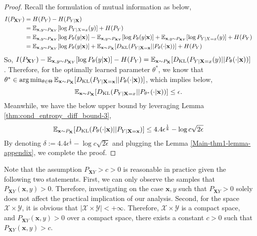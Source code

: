 \begin{proof} 
Recall the formulation of mutual information as below,
\begin{align*}
    I(P_{\mathbf{X}Y})
    &=H(P_Y) - H(P_{Y|\mathbf{X}}) \\
    &=\mathbb{E}_{\mathbf{x},y\sim P_{\mathbf{X}Y}}[\log P_{Y|X=x}(y)] + H(P_Y) \\
    &=\mathbb{E}_{\mathbf{x},y\sim P_{\mathbf{X}Y}}[\log P_{\theta}(y|\mathbf{x})] - \mathbb{E}_{\mathbf{x},y\sim P_{\mathbf{X}Y}}[\log P_{\theta}(y|\mathbf{x})] + \mathbb{E}_{\mathbf{x},y\sim P_{\mathbf{X}Y}}[\log P_{Y|X=x}(y)] + H(P_Y) \\
    &=\mathbb{E}_{\mathbf{x},y\sim P_{\mathbf{X}Y}}[\log P_{\theta}(y|\mathbf{x})] + \mathbb{E}_{\mathbf{x}\sim P_{\mathbf{X}}}[D_{\rm KL}(P_{Y|\mathbf{X}=\mathbf{x}}||P_{\theta}(\cdot|\mathbf{x}))] + H(P_Y) \\
\end{align*}
So, $I(P_{\mathbf{X}Y})-\mathbb{E}_{\mathbf{x},y\sim P_{\mathbf{X}Y}}[\log P_{\theta}(y|\mathbf{x})]-H(P_Y)=\mathbb{E}_{\mathbf{x}\sim P_{\mathbf{X}}}[D_{\rm KL}(P_{Y|\mathbf{X}=x}(y)||P_{\theta}(\cdot|\mathbf{x}))]$.
Therefore, for the optimally learned parameter $\theta^{*}$, we know that $\theta^{*}\in\arg \min_{\theta\in\Theta} \mathbb{E}_{\mathbf{x}\sim P_{\mathbf{X}}}[D_{\rm KL}(P_{Y|\mathbf{X}=\mathbf{x}}||P_{\theta}(\cdot|\mathbf{x}))]$, which implies below,
\begin{equation*}
    \mathbb{E}_{\mathbf{x}\sim P_{\mathbf{X}}}[D_{\rm KL}(P_{Y|\mathbf{X}=x}||P_{\theta^{*}}(\cdot|\mathbf{x}))] \leq \epsilon.
\end{equation*}
Meanwhile, we have the below upper bound by leveraging Lemma \ref{thm:cond_entropy_diff_bound-3},
\begin{equation*}
    \mathbb{E}_{\mathbf{x}\sim P_{\mathbf{X}}}[D_{\rm KL}(P_{\theta}(\cdot|\mathbf{x}) || P_{Y|\mathbf{X}=\mathbf{x}})] \leq 4.4 \epsilon^{\frac{1}{8}}-\log c \sqrt{2\epsilon}
\end{equation*}
By denoting $\delta:=4.4 \epsilon^{\frac{1}{8}}-\log c \sqrt{2\epsilon}$ and plugging the Lemma \ref{Main-thm1-lemma-appendix}, we complete the proof.
\end{proof}

Note that the assumption $P_{\mathbf{X}Y}>c>0$ is reasonable in practice given the following two statements. First, we can only observe the samples that $P_{\mathbf{X}Y}(\mathbf{x},y)>0$. Therefore, investigating on the case $\mathbf{x},y$ such that $P_{\mathbf{X}Y}>0$ solely does not affect the practical implication of our analysis. Second, for the space $\mathcal{X}\times \mathcal{Y}$, it is obvious that $|\mathcal{X}\times \mathcal{Y}|<+\infty$. Therefore, $\mathcal{X}\times \mathcal{Y}$ is a compact space, and $P_{\mathbf{X}Y}(\mathbf{x},y)>0$ over a compact space, there exists a constant $c>0$ such that $P_{\mathbf{X}Y}(\mathbf{x},y)>c$.

